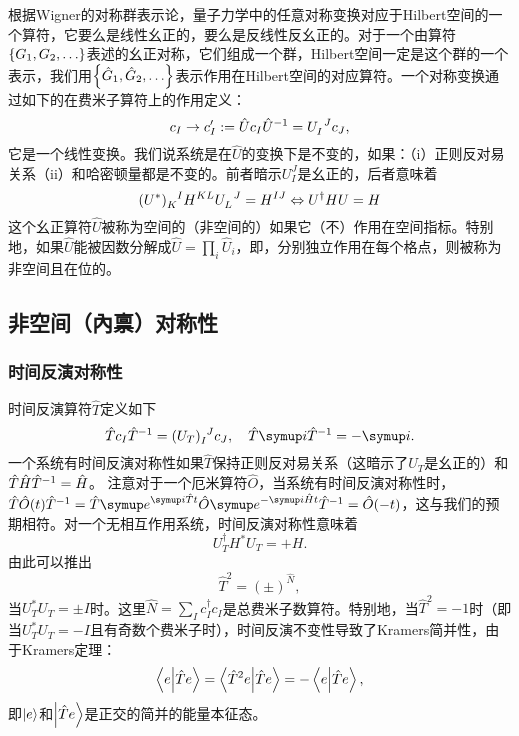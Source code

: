 根据Wigner的对称群表示论，量子力学中的任意对称变换对应于Hilbert空间的一个算符，它要么是线性幺正的，要么是反线性反幺正的。对于一个由算符$\Bqty{G_1,G_2,\dots}$表述的幺正对称，它们组成一个群，Hilbert空间一定是这个群的一个表示，我们用$\Bqty{\hat G_1,\hat G_2,\dots}$表示作用在Hilbert空间的对应算符。一个对称变换通过如下的在费米子算符上的作用定义：
\begin{equation}
  c_I\rightarrow c_I' := \hat U c_I \hat U\inv = U\indices{_I^J} c_J,
\end{equation}
它是一个线性变换。我们说系统是在$\hat U$的变换下是不变的，如果：（i）正则反对易关系（ii）和哈密顿量都是不变的。前者暗示$U_I^J$是幺正的，后者意味着
\begin{equation}
  (U^*)\indices{_K^I} H^{KL}U\indices{_L^J} = H^{IJ} \Leftrightarrow U^\dagger H U=H
\end{equation}
这个幺正算符$\hat U$被称为空间的（非空间的）如果它（不）作用在空间指标。特别地，如果$\hat U$能被因数分解成$\hat U = \prod_i \hat U_i$，即，分别独立作用在每个格点，则被称为非空间且在位的。

\subsection{非空间（內禀）对称性}
\subsubsection{时间反演对称性}
时间反演算符$\hat T$定义如下
\begin{equation}
  \hat T c_I \hat T\inv = (U_T)\indices{_I^J}c_J,\quad \hat T\iu \hat T\inv = -\iu.
\end{equation}
一个系统有时间反演对称性如果$\hat T$保持正则反对易关系（这暗示了$U_T$是幺正的）和$\hat T \hat H \hat T^{-1} =\hat H$。
注意对于一个厄米算符$\hat O$，当系统有时间反演对称性时，$\hat T \hat O(t) \hat T\inv = \hat T \eu^{\iu \hat T t} \hat O \eu^{-\iu \hat H t}\hat T\inv= \hat O(-t)$，这与我们的预期相符。对一个无相互作用系统，时间反演对称性意味着
\begin{equation}
  U_T^\dagger H^* U_T = + H.
\end{equation}
由此可以推出
\begin{equation}
  \hat T^2 = (\pm)^{\hat N},
\end{equation}
当$U_T^*U_T=\pm I$时。这里$\hat N=\sum_I c_I^\dagger c_I$是总费米子数算符。特别地，当$\hat T^2=-1$时（即当$U^*_TU_T=-I$且有奇数个费米子时），时间反演不变性导致了Kramers简并性，由于Kramers定理：
\begin{equation}
  \braket{e}{\hat T e} = \braket{\hat T^2 e}{\hat T e} = -\braket{e}{\hat T e},
\end{equation}
即$\ket{e}$和$\ket{\hat T e}$是正交的简并的能量本征态。

